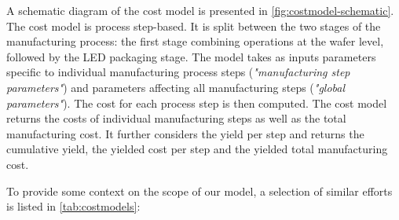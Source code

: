 \documentclass[parskip=full]{article}
\begin{document}
A schematic diagram of the cost model is presented in \cref{fig:costmodel-schematic}. The cost model is process step-based. It is split between the two stages of the manufacturing process: the first stage combining operations at the wafer level, followed by the LED packaging stage. The model takes as inputs parameters specific to individual manufacturing process steps (\textit{"manufacturing step parameters"}) and parameters affecting all manufacturing steps (\textit{"global parameters"}). The cost for each process step is then computed. The cost model returns the costs of individual manufacturing steps as well as the total manufacturing cost. It further considers the yield per step and returns the cumulative yield, the yielded cost per step and the yielded total manufacturing cost.

To provide some context on the scope of our model, a selection of similar efforts is listed in \cref{tab:costmodels}:
\end{document}
